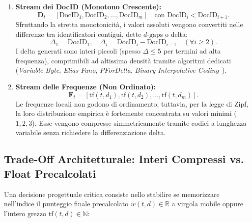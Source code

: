 \begin{enumerate}
    \item \textbf{Stream dei DocID (Monotono Crescente):}
    \begin{equation}
    \mathbf{D}_t = [\text{DocID}_1, \text{DocID}_2, \dots, \text{DocID}_m] \quad \text{con } \text{DocID}_i < \text{DocID}_{i+1}.
    \end{equation}
    Sfruttando la stretta monotonicit\`a, i valori assoluti vengono convertiti nelle differenze tra identificatori contigui, dette \textbf{$d\text{-gaps}$} o delta:
    \begin{equation}
    \Delta_1 = \text{DocID}_1, \quad \Delta_i = \text{DocID}_i - \text{DocID}_{i-1} \quad (\forall i \ge 2).
    \end{equation}
    I delta generati sono interi piccoli (spesso $\Delta \le 5$ per termini ad alta frequenza), comprimibili ad altissima densit\`a tramite algoritmi dedicati (\textit{Variable Byte}, \textit{Elias-Fano}, \textit{PForDelta}, \textit{Binary Interpolative Coding}~\cite{moffat2000}).
    
    \item \textbf{Stream delle Frequenze (Non Ordinato):}
    \begin{equation}
    \mathbf{F}_t = [\text{tf}(t, d_1), \text{tf}(t, d_2), \dots, \text{tf}(t, d_m)].
    \end{equation}
    Le frequenze locali non godono di ordinamento; tuttavia, per la legge di Zipf, la loro distribuzione empirica \`e fortemente concentrata su valori minimi ($1, 2, 3$). Esse vengono compresse simmetricamente tramite codici a lunghezza variabile senza richiedere la differenziazione delta.
\end{enumerate}

\FloatBarrier
\subsection{Trade-Off Architetturale: Interi Compressi vs. Float Precalcolati}
\label{subsec:trade-off-interi-float}
Una decisione progettuale critica consiste nello stabilire se memorizzare nell'indice il punteggio finale precalcolato $w(t, d) \in \mathbb{R}$ a virgola mobile oppure l'intero grezzo $\text{tf}(t, d) \in \mathbb{N}$:

